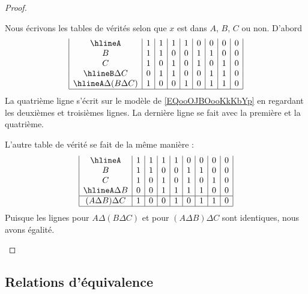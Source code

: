 \begin{proof}
\begin{subproof}
\begin{subequations}
		\end{subequations}
		Nous écrivons les tables de vérités selon que \( x\) est dans \( A\), \( B\), \( C\) ou non. D'abord
		\begin{equation}
			\begin{array}{|c|c|c|c|c|c|c|c|c|}
				\hline%
				A                   & 1 & 1 & 1 & 1 & 0 & 0 & 0 & 0 \\
				B                   & 1 & 1 & 0 & 0 & 1 & 1 & 0 & 0 \\
				C                   & 1 & 0 & 1 & 0 & 1 & 0 & 1 & 0 \\
				\hline%
				B\Delta C           & 0 & 1 & 1 & 0 & 0 & 1 & 1 & 0 \\
				\hline%
				A\Delta (B\Delta C) & 1 & 0 & 0 & 1 & 0 & 1 & 1 & 0 \\
				\hline
			\end{array}
		\end{equation}
		La quatrième ligne s'écrit sur le modèle de \eqref{EQooOJBOooKkKbYp} en regardant les deuxièmes et troisièmes lignes. La dernière ligne se fait avec la première et la quatrième.

		L'autre table de vérité se fait de la même manière :
		\begin{equation}		\label{EQooMHPCooHpzBcY}
			\begin{array}{|c|c|c|c|c|c|c|c|c|}
				\hline%
				A                   & 1 & 1 & 1 & 1 & 0 & 0 & 0 & 0 \\
				B                   & 1 & 1 & 0 & 0 & 1 & 1 & 0 & 0 \\
				C                   & 1 & 0 & 1 & 0 & 1 & 0 & 1 & 0 \\
				\hline%
				A\Delta B           & 0 & 0 & 1 & 1 & 1 & 1 & 0 & 0 \\
				\hline%
				(A\Delta B)\Delta C & 1 & 0 & 0 & 1 & 0 & 1 & 1 & 0 \\
				\hline
			\end{array}
		\end{equation}
		Puisque les lignes pour \( A\Delta (B\Delta C)\) et pour \( (A\Delta B)\Delta C\) sont identiques, nous avons égalité.
	\end{subproof}
\end{proof}

\subsection{Relations d'équivalence}
\label{appEquivalence}

